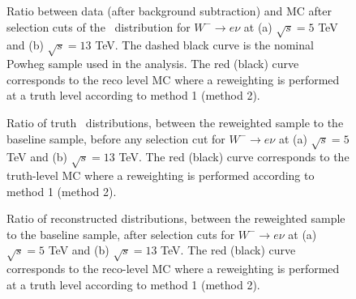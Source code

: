 
\begin{figure}[h]
  \centering
  \caption{Ratio between data (after background subtraction) and MC after selection cuts of the \ut\ distribution for $W^{-}\rightarrow e\nu$ at (a) $\sqrt{s}=5$ TeV and (b) $\sqrt{s}=13$ TeV. The dashed black curve is the nominal Powheg sample used in the analysis. The red (black) curve corresponds to the reco level MC where a reweighting is performed at a truth level according to method 1 (method 2).}
  \label{fig:recoil_dataMCReco}
\end{figure}

\begin{figure}[h]
  \centering
    \caption{Ratio of truth \ptw\ distributions, between the reweighted sample to the baseline sample, before any selection cut for $W^{-}\rightarrow e\nu$ at (a) $\sqrt{s}=5$ TeV and (b) $\sqrt{s}=13$ TeV. The red (black) curve corresponds to the truth-level MC where a reweighting is performed according to method 1 (method 2).}
  \label{fig:bias_truth}
\end{figure}

\begin{figure}[h]
  \centering
    \caption{Ratio of reconstructed \ut distributions, between the reweighted sample to the baseline sample, after selection cuts for $W^{-}\rightarrow e\nu$ at (a) $\sqrt{s}=5$ TeV and (b) $\sqrt{s}=13$ TeV. The red (black) curve corresponds to the reco-level MC where a reweighting is performed at a truth level according to method 1 (method 2).}
  \label{fig:bias_reco}
\end{figure}

